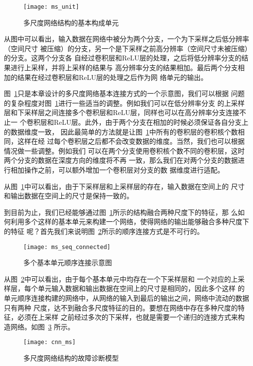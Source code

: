 \begin{figure}[ht]
  \centering
  \texttt{[image: ms\_unit]}
  \caption{多尺度网络结构的基本构成单元}
  \label{fig:ms_unit}
\end{figure}

从图中可以看出，输入数据在网络中被分为两个分支，一个为下采样之后低分辨率（空间尺寸
被压缩）的分支，另一个是下采样之前高分辨率（空间尺寸未被压缩）的分支。这两个分支各
自经过卷积层和ReLU层的处理，之后将低分辨率分支的结果进行上采样，并将上采样的结果与
高分辨率分支的结果相加。最后两个分支相加的结果在经过卷积层和ReLU层的处理之后作为网
络单元的输出。

图~\ref{fig:ms_unit}只是本章设计的多尺度网络基本连接方式的一个示意图，我们可以根据
问题的复杂程度对图~\ref{fig:ms_unit}进行一些适当的调整。例如我们可以在低分辨率分支
的上采样层和下采样层之间连接多个卷积层和ReLU层，同样也可以在高分辨率分支连接不止一
个卷积层和ReLU层。此外，由于两个分支在相加的时候必须保证各自分支上的数据维度一致，
因此最简单的方法就是让图~\ref{fig:ms_unit}中所有的卷积层的卷积核个数相同，这样在经
过每个卷积层之后都不会改变数据的维度。当然，我们也可以根据情况做一些调整。例如我们
可以在两个分支使用卷积核个数不同的卷积层，这时两个分支的数据在深度方向的维度将不再
一致，那么我们在对两个分支的数据进行相加操作之前，可以额外增加一个卷积层对分支的数
据维度进行适配。

从图~\ref{fig:ms_unit}中可以看出，由于下采样层和上采样层的存在，输入数据在空间上的
尺寸和输出数据在空间上的尺寸是保持一致的。

到目前为止，我们已经能够通过图~\ref{fig:ms_unit}所示的结构融合两种尺度下的特征，那
么如何利用多个这样的基本单元来构建一个网络，使得网络的输出能够融合多种尺度下的特征
呢？首先我们来说明图~\ref{fig:ms_seq_connected}所示的顺序连接方式是不可行的。
\begin{figure}[ht]
  \centering
  \texttt{[image: ms\_seq\_connected]}
  \caption{多个基本单元顺序连接示意图}
  \label{fig:ms_seq_connected}
\end{figure}

从图~\ref{fig:ms_seq_connected}中可以看出，由于每个基本单元中均存在一个下采样层和
一个对应的上采样层，每个单元输入数据和输出数据在空间上的尺寸是相同的，因此多个这样
的单元顺序连接构建的网络中，从网络的输入到最后的输出之间，网络中流动的数据只有两种
尺度，达不到融合多尺度特征的目的。要想在网络中存在多种尺度的特征，必须在上采样
之前经过多次的下采样，也就是需要一个递归的连接方式来构造网络。如图~\ref{fig:cnn_ms}
所示。
\begin{figure}[ht]
  \centering
  \texttt{[image: cnn\_ms]}
  \caption{多尺度网络结构的故障诊断模型}
  \label{fig:cnn_ms}
\end{figure}

